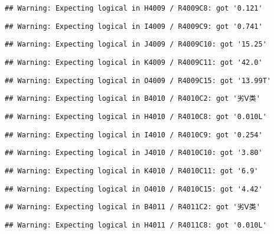 \documentclass[
]{article}
\begin{document}
\begin{verbatim}
## Warning: Expecting logical in H4009 / R4009C8: got '0.121'
\end{verbatim}

\begin{verbatim}
## Warning: Expecting logical in I4009 / R4009C9: got '0.741'
\end{verbatim}

\begin{verbatim}
## Warning: Expecting logical in J4009 / R4009C10: got '15.25'
\end{verbatim}

\begin{verbatim}
## Warning: Expecting logical in K4009 / R4009C11: got '42.0'
\end{verbatim}

\begin{verbatim}
## Warning: Expecting logical in O4009 / R4009C15: got '13.99T'
\end{verbatim}

\begin{verbatim}
## Warning: Expecting logical in B4010 / R4010C2: got '劣Ⅴ类'
\end{verbatim}

\begin{verbatim}
## Warning: Expecting logical in H4010 / R4010C8: got '0.010L'
\end{verbatim}

\begin{verbatim}
## Warning: Expecting logical in I4010 / R4010C9: got '0.254'
\end{verbatim}

\begin{verbatim}
## Warning: Expecting logical in J4010 / R4010C10: got '3.80'
\end{verbatim}

\begin{verbatim}
## Warning: Expecting logical in K4010 / R4010C11: got '6.9'
\end{verbatim}

\begin{verbatim}
## Warning: Expecting logical in O4010 / R4010C15: got '4.42'
\end{verbatim}

\begin{verbatim}
## Warning: Expecting logical in B4011 / R4011C2: got '劣Ⅴ类'
\end{verbatim}

\begin{verbatim}
## Warning: Expecting logical in H4011 / R4011C8: got '0.010L'
\end{verbatim}
\end{document}
